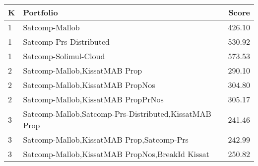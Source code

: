 \begin{tabular}{l|p{.9\linewidth}|r}
\toprule
K & Portfolio & Score \\
\midrule
1 & Satcomp-Mallob & 426.10 \\
1 & Satcomp-Prs-Distributed & 530.92 \\
1 & Satcomp-Solimul-Cloud & 573.53 \\
2 & Satcomp-Mallob,KissatMAB Prop & 290.10 \\
2 & Satcomp-Mallob,KissatMAB PropNos & 304.80 \\
2 & Satcomp-Mallob,KissatMAB PropPrNos & 305.17 \\
3 & Satcomp-Mallob,Satcomp-Prs-Distributed,KissatMAB Prop & 241.46 \\
3 & Satcomp-Mallob,KissatMAB Prop,Satcomp-Prs & 242.99 \\
3 & Satcomp-Mallob,KissatMAB PropNos,BreakId Kissat & 250.82 \\
\bottomrule
\end{tabular}

